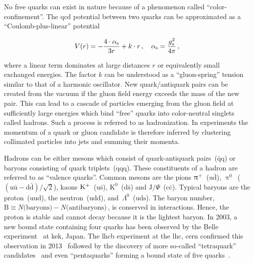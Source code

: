 No free quarks can exist in nature because of a phenomenon called ``color-confinement''. The \gls{qcd} potential between two quarks can be approximated as a ``Coulomb-plus-linear'' potential~\cite{Sumino2003173}

\begin{equation}
V(r)=-\frac{4\cdot{\alpha_\textrm{s}}}{3r}+k\cdot r\,,\quad {\alpha_\textrm{s}}=\frac{g_{s}^2}{4\pi}\,,
\end{equation}

where a linear term dominates at large distances $r$ or equivalently small exchanged energies. The factor $k$ can be understood as a ``gluon-spring'' tension similar to that of a harmonic oscillator. New quark/antiquark pairs can be created from the vacuum if the gluon field energy exceeds the mass of the new pair. This can lead to a cascade of particles emerging from the gluon field at sufficiently large energies which bind ``free'' quarks into color-neutral singlets called hadrons. Such a process is referred to as hadronization. In experiments the momentum of a quark or gluon candidate is therefore inferred by clustering collimated particles into jets and summing their momenta. 

Hadrons can be either mesons which consist of quark-antiquark pairs~($\bar{\mathrm{q}}\mathrm{q}$) or baryons consisting of quark triplets~($\mathrm{qqq}$). These constituents of a hadron are referred to as ``valence quarks''. Common mesons are the pions $\uppi^{+}$~($\mathrm{u}\bar{\mathrm{d}}$), $\uppi^{0}$~($(\mathrm{u}\bar{\mathrm{u}}-\mathrm{d}\bar{\mathrm{d}})/\sqrt{2}$), kaons $\mathrm{K}^{+}$~($\mathrm{u}\bar{\mathrm{s}}$), $\mathrm{K}^{0}$~($\mathrm{d}\bar{\mathrm{s}}$) and $\mathrm{J}/\Psi$~($\mathrm{c}\bar{\mathrm{c}}$). Typical baryons are the proton~($\mathrm{uud}$), the neutron~($\mathrm{udd}$), and~$\Lambda^{0}$~($\mathrm{uds}$). The baryon number, $\mathrm{B}\equiv N\text{(baryons)}-N\text{(antibaryons)}\,$, is conserved in interactions. Hence, the proton is stable and cannot decay because it is the lightest baryon. In 2003, a new bound state containing four quarks has been observed by the Belle experiment~\cite{PhysRevLett.91.262001} at \gls{kek}, Japan. The \gls{lhcb} experiment at the \gls{lhc}, \gls{cern} confirmed this observation in 2013~\cite{Aaij:2013zoa} followed by the discovery of more so-called ``tetraquark'' candidates~\cite{Aaij:2014jqa,Aaij:2016iza} and even ``pentaquarks'' forming a bound state of five quarks~\cite{Aaij:2015tga}.

